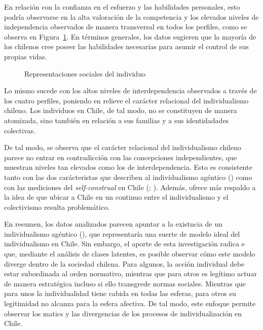 \documentclass[
  12pt,
  letterpaper,
  DIV=11,
  numbers=noendperiod]{scrartcl}
\makeatletter
\newcommand*\pandocbounded[1]{%
  \sbox\pandoc@box{#1}%
  \Gscale@div\@tempa{\textheight}{\dimexpr\ht\pandoc@box+\dp\pandoc@box\relax}%
  \Gscale@div\@tempb{\linewidth}{\wd\pandoc@box}%
  \ifdim\@tempb\p@<\@tempa\p@\let\@tempa\@tempb\fi%
  \ifdim\@tempa\p@<\p@\scalebox{\@tempa}{\usebox\pandoc@box}%
  \else\usebox{\pandoc@box}%
  \fi%
}
\makeatother
\begin{document}
En relación con la confianza en el esfuerzo y las habilidades
personales, esto podría observarse en la alta valoración de la
competencia y los elevados niveles de independencia observados de manera
transversal en todos los perfiles, como se observa en
Figura~\ref{fig-concepciones}. En términos generales, los datos sugieren
que la mayoría de los chilenos cree poseer las habilidades necesarias
para asumir el control de sus propias vidas.

\begin{figure}[H]

\centering{

\pandocbounded{\texttt{[image: paper\_files/figure-pdf/fig-concepciones-1.pdf]}}

}

\caption{\label{fig-concepciones}Representaciones sociales del
individuo}

\end{figure}%

Lo mismo sucede con los altos niveles de interdependencia observados a
través de los cuatro perfiles, poniendo en relieve el carácter
relacional del individualismo chileno. Los individuos en Chile, de tal
modo, no se constituyen de manera atomizada, sino también en relación a
sus familias y a sus identidadades colectivas.

De tal modo, se observa que el carácter relacional del individualismo
chileno parece no entrar en contradicción con las concepciones
independientes, que muestran niveles tan elevados como los de
interdependencia. Esto es consistente tanto con las dos carácteristas
que describen al individualismo agéntico
() como con las
mediciones del \emph{self-construal} en Chile
(;
). Además, ofrece
más respaldo a la idea de que ubicar a Chile en un continuo entre el
individualismo y el colectivismo resulta problemático.

En resumen, los datos analizados parecen apuntar a la existncia de un
individualismo agéntico (), que representaría una suerte de modelo ideal del
individualismo en Chile. Sin embargo, el aporte de esta investigación
radica e que, mediante el análisis de clases latentes, es posible
observar cómo este modelo diverge dentro de la sociedad chilena. Para
algunos, la acción individual debe estar subordinada al orden normativo,
mientras que para otros es legítimo actuar de manera estratégica incluso
si ello transgrede normas sociales. Mientras que para unos la
individualidad tiene cabida en todas las esferas, para otros su
legitimidad no alcanza para la esfera afectiva. De tal modo, este
enfoque permite observar los matics y las divergencias de los procesos
de individualización en Chile.
\end{document}
